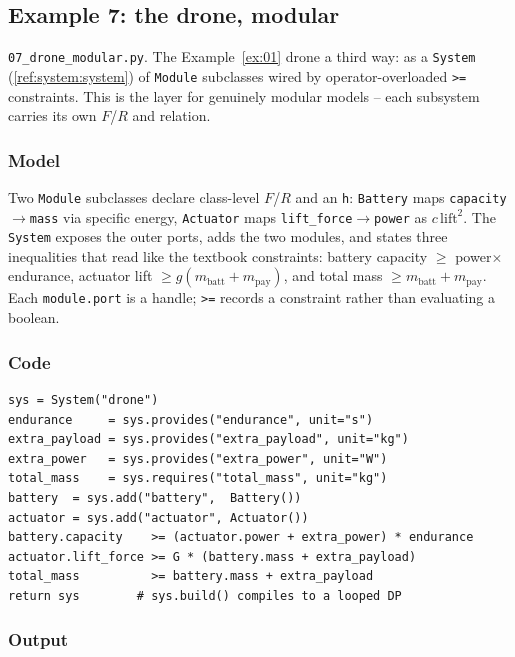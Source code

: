 \documentclass[11pt,a4paper]{article}
\begin{document}
\subsection{Example 7: the drone, modular}\label{ex:07}

\texttt{07\_drone\_modular.py}. The Example~\ref{ex:01} drone a third way:
as a \texttt{System} (\ref{ref:system:system}) of \texttt{Module}
subclasses wired by operator-overloaded \texttt{>=} constraints. This is
the layer for genuinely modular models -- each subsystem carries its own
$F$/$R$ and relation.

\subsubsection*{Model}

Two \texttt{Module} subclasses declare class-level $F$/$R$ and an
\texttt{h}: \texttt{Battery} maps \texttt{capacity}$\to$\texttt{mass} via
specific energy, \texttt{Actuator} maps
\texttt{lift\_force}$\to$\texttt{power} as $c\,\text{lift}^2$. The
\texttt{System} exposes the outer ports, adds the two modules, and states
three inequalities that read like the textbook constraints:
battery capacity $\ge$ power$\times$endurance, actuator lift $\ge
g(m_{\text{batt}}+m_{\text{pay}})$, and total mass $\ge m_{\text{batt}}+
m_{\text{pay}}$. Each \texttt{module.port} is a handle; \texttt{>=}
records a constraint rather than evaluating a boolean.

\subsubsection*{Code}

\begin{lstlisting}
sys = System("drone")
endurance     = sys.provides("endurance", unit="s")
extra_payload = sys.provides("extra_payload", unit="kg")
extra_power   = sys.provides("extra_power", unit="W")
total_mass    = sys.requires("total_mass", unit="kg")
battery  = sys.add("battery",  Battery())
actuator = sys.add("actuator", Actuator())
battery.capacity    >= (actuator.power + extra_power) * endurance
actuator.lift_force >= G * (battery.mass + extra_payload)
total_mass          >= battery.mass + extra_payload
return sys        # sys.build() compiles to a looped DP
\end{lstlisting}

\subsubsection*{Output}
\end{document}
